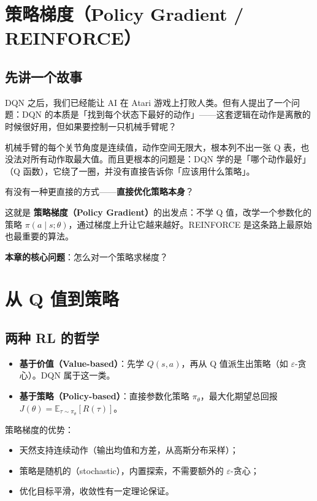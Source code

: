 \documentclass{article}
\begin{document}
\section*{策略梯度（Policy Gradient / REINFORCE）}

\subsection*{先讲一个故事}

DQN 之后，我们已经能让 AI 在 Atari 游戏上打败人类。但有人提出了一个问题：DQN 的本质是「找到每个状态下最好的动作」——这套逻辑在动作是离散的时候很好用，但如果要控制一只机械手臂呢？

机械手臂的每个关节角度是连续值，动作空间无限大，根本列不出一张 Q 表，也没法对所有动作取最大值。而且更根本的问题是：DQN 学的是「哪个动作最好」（Q 函数），它绕了一圈，并没有直接告诉你「应该用什么策略」。

有没有一种更直接的方式——\textbf{直接优化策略本身}？

这就是 \textbf{策略梯度（Policy Gradient）}的出发点：不学 Q 值，改学一个参数化的策略 $\pi(a \mid s; \theta)$，通过梯度上升让它越来越好。REINFORCE 是这条路上最原始也最重要的算法。

\textbf{本章的核心问题}：怎么对一个策略求梯度？

\section*{从 Q 值到策略}

\subsection*{两种 RL 的哲学}

\begin{itemize}
  \item \textbf{基于价值（Value-based）}：先学 $Q(s,a)$，再从 Q 值派生出策略（如 $\varepsilon$-贪心）。DQN 属于这一类。
  \item \textbf{基于策略（Policy-based）}：直接参数化策略 $\pi_\theta$，最大化期望总回报 $J(\theta) = \mathbb{E}_{\tau \sim \pi_\theta}[R(\tau)]$。
\end{itemize}

策略梯度的优势：
\begin{itemize}
  \item 天然支持连续动作（输出均值和方差，从高斯分布采样）；
  \item 策略是随机的（stochastic），内置探索，不需要额外的 $\varepsilon$-贪心；
  \item 优化目标平滑，收敛性有一定理论保证。
\end{itemize}
\end{document}
